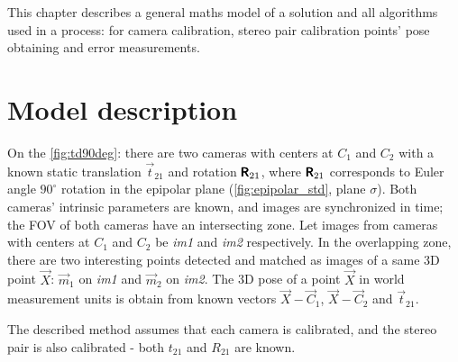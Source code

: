 This chapter describes a general maths model of a solution and all algorithms used in a process: for camera calibration, stereo pair calibration points' pose obtaining and error measurements.

\section{Model description}

On the \autoref{fig:td90deg}: there are two cameras with centers at $C_1$ and $C_2$ with a known static translation $\vec{t}_{21}$ and rotation $\pmb{\mathsf{R}}_{21}$, where $\pmb{\mathsf{R}}_{21}$ corresponds to Euler angle $90^\circ$ rotation in the epipolar plane (\autoref{fig:epipolar_std}, plane $\sigma$).
Both cameras' intrinsic parameters are known, and images are synchronized in time; the FOV of both cameras have an intersecting zone.
Let images from cameras with centers at $C_1$ and $C_2$ be \textit{im1} and \textit{im2} respectively.
In the overlapping zone, there are two interesting points detected and matched as images of a same 3D point $\vec{X}$: $\vec{m}_1$ on \textit{im1} and $\vec{m}_2$ on \textit{im2}.
The 3D pose of a point $\vec{X}$ in world measurement units is obtain from known vectors $\vec{X} - \vec{C}_1$, $\vec{X} - \vec{C}_2$ and $\vec{t}_{21}$. 

The described method assumes that each camera is calibrated, and the stereo pair is also calibrated - both $t_{21}$ and $R_{21}$ are known.

